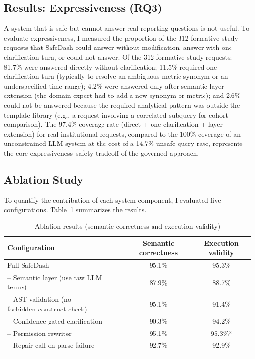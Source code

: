 \documentclass[11pt]{article}
\begin{document}
\subsection{Results: Expressiveness (RQ3)}
A system that is safe but cannot answer real reporting questions is not useful. To evaluate expressiveness, I measured the proportion of the 312 formative‑study requests that SafeDash could answer without modification, answer with one clarification turn, or could not answer. Of the 312 formative‑study requests: 81.7\% were answered directly without clarification; 11.5\% required one clarification turn (typically to resolve an ambiguous metric synonym or an underspecified time range); 4.2\% were answered only after semantic layer extension (the domain expert had to add a new synonym or metric); and 2.6\% could not be answered because the required analytical pattern was outside the template library (e.g., a request involving a correlated subquery for cohort comparison). The 97.4\% coverage rate (direct + one clarification + layer extension) for real institutional requests, compared to the 100\% coverage of an unconstrained LLM system at the cost of a 14.7\% unsafe query rate, represents the core expressiveness–safety tradeoff of the governed approach.

\subsection{Ablation Study}
To quantify the contribution of each system component, I evaluated five configurations. Table~\ref{tab:ablation} summarizes the results.

\begin{longtable}{lcc}
\toprule
\textbf{Configuration} & \textbf{Semantic correctness} & \textbf{Execution validity}\\
\midrule
Full SafeDash & 95.1\% & 95.3\%\\
– Semantic layer (use raw LLM terms) & 87.9\% & 88.7\%\\
– AST validation (no forbidden‑construct check) & 95.1\% & 91.4\%\\
– Confidence‑gated clarification & 90.3\% & 94.2\%\\
– Permission rewriter & 95.1\% & 95.3\%*\\
– Repair call on parse failure & 92.7\% & 92.9\%\\
\bottomrule
\caption{Ablation results (semantic correctness and execution validity)}\label{tab:ablation}
\end{longtable}
\end{document}

